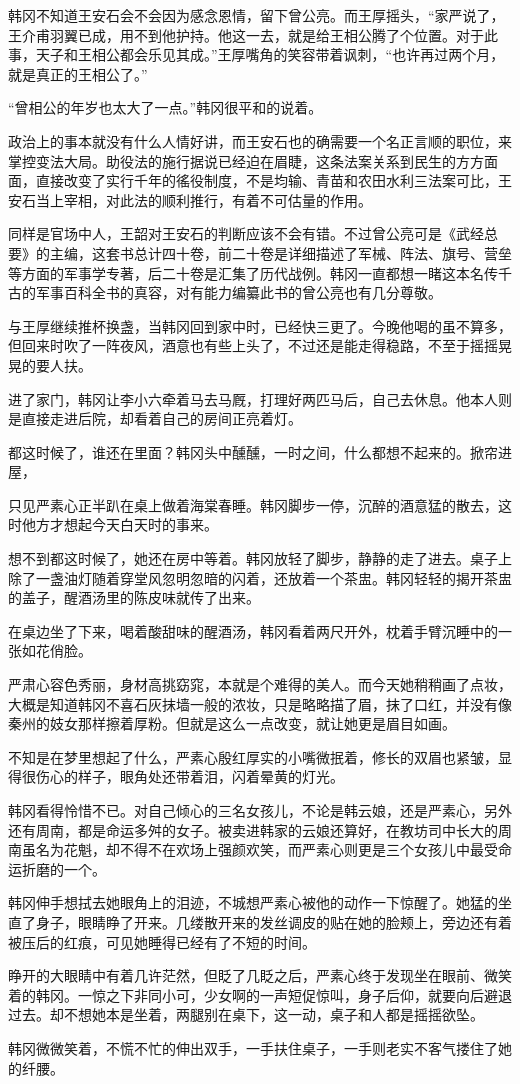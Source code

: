韩冈不知道王安石会不会因为感念恩情，留下曾公亮。而王厚摇头，“家严说了，王介甫羽翼已成，用不到他护持。他这一去，就是给王相公腾了个位置。对于此事，天子和王相公都会乐见其成。”王厚嘴角的笑容带着讽刺，“也许再过两个月，就是真正的王相公了。”

“曾相公的年岁也太大了一点。”韩冈很平和的说着。

政治上的事本就没有什么人情好讲，而王安石也的确需要一个名正言顺的职位，来掌控变法大局。助役法的施行据说已经迫在眉睫，这条法案关系到民生的方方面面，直接改变了实行千年的徭役制度，不是均输、青苗和农田水利三法案可比，王安石当上宰相，对此法的顺利推行，有着不可估量的作用。

同样是官场中人，王韶对王安石的判断应该不会有错。不过曾公亮可是《武经总要》的主编，这套书总计四十卷，前二十卷是详细描述了军械、阵法、旗号、营垒等方面的军事学专著，后二十卷是汇集了历代战例。韩冈一直都想一睹这本名传千古的军事百科全书的真容，对有能力编纂此书的曾公亮也有几分尊敬。

与王厚继续推杯换盏，当韩冈回到家中时，已经快三更了。今晚他喝的虽不算多，但回来时吹了一阵夜风，酒意也有些上头了，不过还是能走得稳路，不至于摇摇晃晃的要人扶。

进了家门，韩冈让李小六牵着马去马厩，打理好两匹马后，自己去休息。他本人则是直接走进后院，却看着自己的房间正亮着灯。

都这时候了，谁还在里面？韩冈头中醺醺，一时之间，什么都想不起来的。掀帘进屋，

只见严素心正半趴在桌上做着海棠春睡。韩冈脚步一停，沉醉的酒意猛的散去，这时他方才想起今天白天时的事来。

想不到都这时候了，她还在房中等着。韩冈放轻了脚步，静静的走了进去。桌子上除了一盏油灯随着穿堂风忽明忽暗的闪着，还放着一个茶盅。韩冈轻轻的揭开茶盅的盖子，醒酒汤里的陈皮味就传了出来。

在桌边坐了下来，喝着酸甜味的醒酒汤，韩冈看着两尺开外，枕着手臂沉睡中的一张如花俏脸。

严肃心容色秀丽，身材高挑窈窕，本就是个难得的美人。而今天她稍稍画了点妆，大概是知道韩冈不喜石灰抹墙一般的浓妆，只是略略描了眉，抹了口红，并没有像秦州的妓女那样擦着厚粉。但就是这么一点改变，就让她更是眉目如画。

不知是在梦里想起了什么，严素心殷红厚实的小嘴微抿着，修长的双眉也紧皱，显得很伤心的样子，眼角处还带着泪，闪着晕黄的灯光。

韩冈看得怜惜不已。对自己倾心的三名女孩儿，不论是韩云娘，还是严素心，另外还有周南，都是命运多舛的女子。被卖进韩家的云娘还算好，在教坊司中长大的周南虽名为花魁，却不得不在欢场上强颜欢笑，而严素心则更是三个女孩儿中最受命运折磨的一个。

韩冈伸手想拭去她眼角上的泪迹，不城想严素心被他的动作一下惊醒了。她猛的坐直了身子，眼睛睁了开来。几缕散开来的发丝调皮的贴在她的脸颊上，旁边还有着被压后的红痕，可见她睡得已经有了不短的时间。

睁开的大眼睛中有着几许茫然，但眨了几眨之后，严素心终于发现坐在眼前、微笑着的韩冈。一惊之下非同小可，少女啊的一声短促惊叫，身子后仰，就要向后避退过去。却不想她本是坐着，两腿别在桌下，这一动，桌子和人都是摇摇欲坠。

韩冈微微笑着，不慌不忙的伸出双手，一手扶住桌子，一手则老实不客气搂住了她的纤腰。

